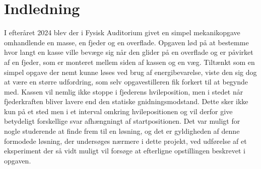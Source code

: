 \chapter{Indledning}
I efteråret 2024 blev der i Fysisk Auditorium givet en simpel mekanikopgave
omhandlende en masse, en fjeder og en overflade. Opgaven lød  på at bestemme hvor
langt en kasse ville bevæge sig når den glider på en overflade og er påvirket af en fjeder, 
som er monteret mellem siden af kassen og en væg. Tiltænkt som en simpel opgave der nemt kunne løses 
ved brug af energibevarelse, viste den sig dog at være en større udfordring, som selv opgavestilleren fik forkert til at begynde med.
Kassen vil nemlig ikke stoppe i fjederens hvileposition, men i stedet når fjederkraften bliver lavere end den statiske gnidningsmodstand. Dette sker ikke kun på et sted men
i et interval omkring hvilepositionen og vil derfor give betydeligt forskellige svar 
afhængningt af startpositionen. Det var muligt for nogle studerende at finde frem til en løsning, 
og det er gyldigheden af denne formodede løsning, 
der undersøges nærmere i dette projekt, ved udførelse af et eksperiment der så vidt muligt vil forsøge at efterligne opstillingen beskrevet i opgaven. \cite{Opgave}